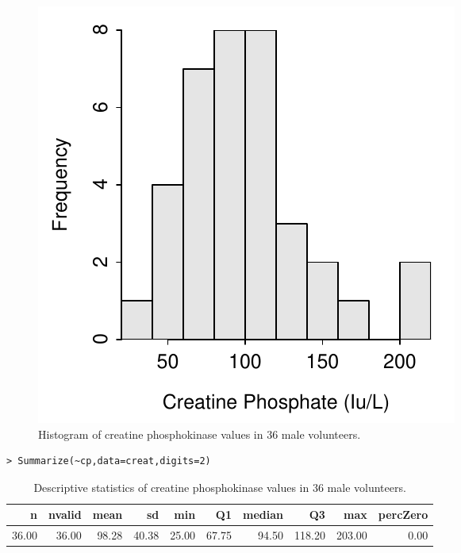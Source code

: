 \documentclass[10pt,openany]{book}\usepackage[]{graphicx}\usepackage[]{color}
\makeatletter
\newenvironment{kframe}{%
 \def\at@end@of@kframe{}%
 \ifinner\ifhmode%
  \def\at@end@of@kframe{\end{minipage}}%
  \begin{minipage}{\columnwidth}%
 \fi\fi%
 \def\FrameCommand##1{\hskip\@totalleftmargin \hskip-\fboxsep
 \colorbox{shadecolor}{##1}\hskip-\fboxsep
     \hskip-\linewidth \hskip-\@totalleftmargin \hskip\columnwidth}%
 \MakeFramed {\advance\hsize-\width
   \@totalleftmargin\z@ \linewidth\hsize
   \@setminipage}}%
 {\par\unskip\endMakeFramed%
 \at@end@of@kframe}
\newenvironment{knitrout}{}{} %
\makeatother
\begin{document}
\begin{itemize}
\begin{knitrout}
\begin{figure}[hbtp]
{\centering \includegraphics[width=.4\linewidth]{Figs/CPHist-1} 

}

\caption[Histogram of creatine phosphokinase values in 36 male volunteers]{Histogram of creatine phosphokinase values in 36 male volunteers.}\label{fig:CPHist}
\end{figure}


\end{knitrout}
\begin{knitrout}
\color{fgcolor}\begin{kframe}
\begin{verbatim}
> Summarize(~cp,data=creat,digits=2)
\end{verbatim}
\end{kframe}
\end{knitrout}
\begin{table}[ht]
\centering
\caption{Descriptive statistics of creatine phosphokinase values in 36 male volunteers.} 
\label{tab:CPSum}
\begin{tabular}{rrrrrrrrrr}
  \hline
n & nvalid & mean & sd & min & Q1 & median & Q3 & max & percZero \\ 
  \hline
36.00 & 36.00 & 98.28 & 40.38 & 25.00 & 67.75 & 94.50 & 118.20 & 203.00 & 0.00 \\ 
   \hline
\end{tabular}
\end{table}





\end{itemize}
\end{document}

